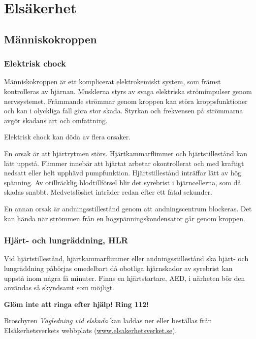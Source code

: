 \chapter{Elsäkerhet}

\section{Människokroppen}

\subsection{Elektrisk chock}

Människokroppen är ett komplicerat elektrokemiskt system, som främst
kontrolleras av hjärnan.
Musklerna styrs av svaga elektriska strömimpulser genom nervsystemet.
Främmande strömmar genom kroppen kan störa kroppsfunktioner och kan i olyckliga
fall göra stor skada.
Styrkan och frekvensen på strömmarna avgör skadans art och omfattning.

Elektrisk chock kan döda av flera orsaker.

En orsak är att hjärtrytmen störs.
Hjärtkammarflimmer och hjärtstillestånd kan lätt uppstå.
Flimmer innebär att hjärtat arbetar okontrollerat och med kraftigt nedsatt
eller helt upphävd pumpfunktion.
Hjärtstillestånd inträffar lätt av hög spänning.
Av otillräcklig blodtillförsel blir det syrebrist i hjärncellerna, som då
skadas snabbt.
Medvetslöshet inträder redan efter ett fåtal sekunder.

En annan orsak är andningsstillestånd genom att andningscentrum blockeras.
Det kan hända när strömmen från en högspänningskondensator går genom kroppen.

\subsection{Hjärt- och lungräddning, HLR}

Vid hjärtstillestånd, hjärtkammarflimmer eller andningsstillestånd ska
hjärt- och lungräddning påbörjas omedelbart då obotliga hjärnskador av
syrebrist kan uppstå inom några få minuter.
Finns en hjärtstartare, AED, i närheten bör den användas så skyndsamt som
möjligt.

\textbf{Glöm inte att ringa efter hjälp! Ring 112!}

Broschyren \emph{Vägledning vid elskada} kan laddas ner eller beställas från
Elsäkerhetsverkets webbplats
(\href{http://www.elsakerhetsverket.se}{www.elsakerhetsverket.se}).

